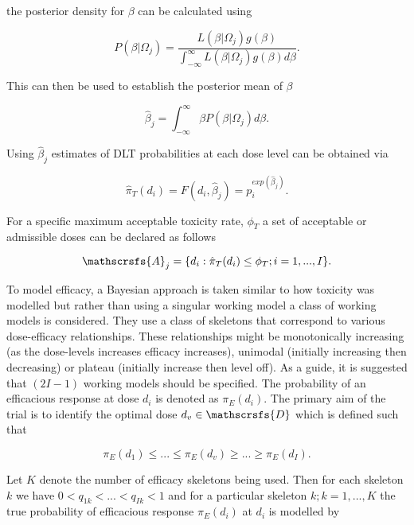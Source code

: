the posterior density for $\beta$ can be calculated using  

\begin{equation}
P(\beta|\Omega_j) = \frac{L(\beta|\Omega_j)g(\beta)}{\int_{-\infty}^{\infty}L(\beta|\Omega_j)g(\beta)d\beta}. 
\end{equation}

This can then be used to establish the posterior mean of $\beta$

\begin{equation}
\hat{\beta}_j = \int_{-\infty}^{\infty}\beta P(\beta|\Omega_j)d\beta.
\end{equation} 

Using $\hat{\beta}_j$ estimates of DLT probabilities at each dose level can be obtained via 

\begin{equation}
\hat{\pi}_T(d_i) = F(d_i, \hat{\beta}_j) = p_i^{exp(\hat{\beta}_j)}. 
\end{equation}

For a specific maximum acceptable toxicity rate, $\phi_T$ a set of acceptable or admissible doses can be declared as follows

\begin{equation}
\mathscrsfs{A}_j = \{d_i : \hat{\pi}_T(d_i)  \leq \phi_T ; i = 1,...,I \}.
\end{equation} 

To model efficacy, a Bayesian approach is taken similar to how toxicity was modelled but rather than using a singular working model a class of working models is considered. They use a class of skeletons that correspond to various dose-efficacy relationships. These relationships might be monotonically increasing (as the dose-levels increases efficacy increases), unimodal (initially increasing then decreasing) or plateau (initially increase then level off). As a guide, it is suggested that $(2I-1)$ working models should be specified. The probability of an efficacious response at dose $d_i$ is denoted as $\pi_E(d_i)$. The primary aim of the trial is to identify the optimal dose $d_v \in \mathscrsfs{D}$ which is defined such that 

\begin{equation}
\pi_E(d_1) \leq ... \leq \pi_E(d_v) \geq ... \geq \pi_E(d_I). 
\end{equation}

Let $K$ denote the number of efficacy skeletons being used. Then for each skeleton $k$ we have $0 < q_{1k} < ... <q_{Ik} <1$ and for a particular skeleton $k; k = 1,...,K$ the true probability of efficacious response $\pi_E(d_i)$ at $d_i$ is modelled by 

